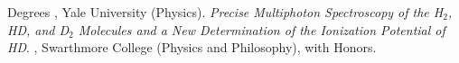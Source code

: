 %
%
\begin{rubric}{Degrees}%
, Yale University (Physics). \emph{Precise Multiphoton Spectroscopy of the H$_2$, HD, and D$_2$ Molecules and a New Determination of the Ionization Potential of HD}.
, Swarthmore College (Physics and Philosophy), with Honors.
\end{rubric}

